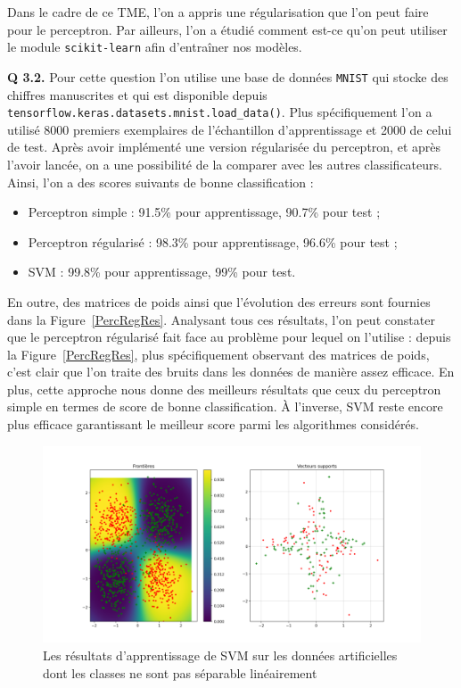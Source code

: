 \documentclass[a4paper,11pt]{article}
\theoremstyle{plain}
\theoremstyle{definition}
\begin{document}
Dans le cadre de ce TME, l'on a appris une régularisation que l'on peut faire pour le perceptron. Par ailleurs, l'on a étudié comment est-ce qu'on peut utiliser le module \texttt{scikit-learn} afin d'entraîner nos modèles.

\textbf{Q 3.2.} Pour cette question l'on utilise une base de données \texttt{MNIST} qui stocke des chiffres manuscrites et qui est disponible depuis \texttt{tensorflow.keras.datasets.mnist.load\_data()}. Plus spécifiquement l'on a utilisé 8000 premiers exemplaires de l’échantillon d'apprentissage et 2000 de celui de test. Après avoir implémenté une version régularisée du perceptron, et après l'avoir lancée, on a une possibilité de la comparer avec les autres classificateurs. Ainsi, l'on a des scores suivants de bonne classification :

\begin{itemize}
    \item Perceptron simple : 91.5\%  pour apprentissage, 90.7\%  pour test ;
    \item Perceptron régularisé : 98.3\%  pour apprentissage, 96.6\%  pour test ;
    \item SVM : 99.8\%  pour apprentissage, 99\%  pour test.
\end{itemize}
En outre, des matrices de poids ainsi que l'évolution des erreurs sont fournies dans la Figure~\ref{PercRegRes}. Analysant tous ces résultats, l'on peut constater que le perceptron régularisé fait face au problème pour lequel on l'utilise : depuis la Figure~\ref{PercRegRes}, plus spécifiquement observant des matrices de poids, c'est clair que l'on traite des bruits dans les données de manière assez efficace. En plus, cette approche nous donne des meilleurs résultats que ceux du perceptron simple en termes de score de bonne classification. À l'inverse, SVM reste encore plus efficace garantissant le meilleur score parmi les algorithmes considérés.

\begin{figure}
    \centering
    \includegraphics{Figures/Figure_14.png}
    \caption{Les résultats d'apprentissage de SVM sur les données artificielles dont les classes ne sont pas séparable linéairement}
    \label{SVMTest}
\end{figure}
\end{document}
